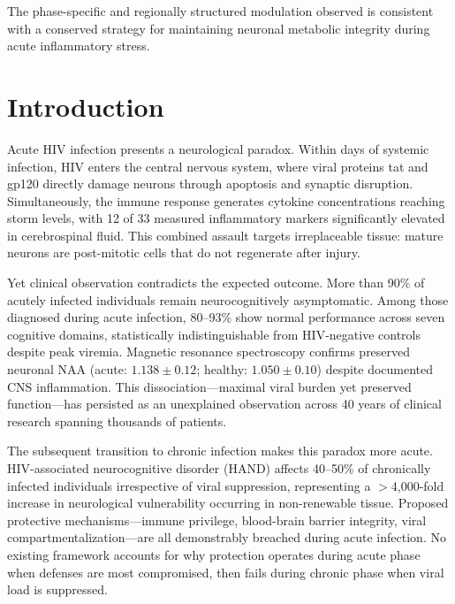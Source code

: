 \documentclass[10pt,a4paper]{article}
\begin{document}
The phase-specific and regionally structured modulation observed is consistent with a conserved strategy for maintaining neuronal metabolic integrity during acute inflammatory stress.

\section{Introduction}

Acute HIV infection presents a neurological paradox. Within days of systemic infection, HIV enters the central nervous system, where viral proteins tat and gp120 directly damage neurons through apoptosis and synaptic disruption\cite{valcour2012,nath2002,kaul1999}. Simultaneously, the immune response generates cytokine concentrations reaching storm levels, with 12 of 33 measured inflammatory markers significantly elevated in cerebrospinal fluid\cite{stacey2009,muema2020}. This combined assault targets irreplaceable tissue: mature neurons are post-mitotic cells that do not regenerate after injury\cite{aranda2012,herrup2007}.

Yet clinical observation contradicts the expected outcome. More than 90\% of acutely infected individuals remain neurocognitively asymptomatic\cite{cheret2025}. Among those diagnosed during acute infection, 80--93\% show normal performance across seven cognitive domains, statistically indistinguishable from HIV-negative controls despite peak viremia\cite{moore2011,cohen2010,schacker1996}. Magnetic resonance spectroscopy confirms preserved neuronal NAA (acute: $1.138 \pm 0.12$; healthy: $1.050 \pm 0.10$) despite documented CNS inflammation\cite{sailasuta2012}. This dissociation---maximal viral burden yet preserved function---has persisted as an unexplained observation across 40 years of clinical research spanning thousands of patients.

The subsequent transition to chronic infection makes this paradox more acute. HIV-associated neurocognitive disorder (HAND) affects 40--50\% of chronically infected individuals irrespective of viral suppression\cite{thompson2024}, representing a $>$4,000-fold increase in neurological vulnerability occurring in non-renewable tissue. Proposed protective mechanisms---immune privilege\cite{carson2006}, blood-brain barrier integrity\cite{banks2006}, viral compartmentalization\cite{joseph2019}---are all demonstrably breached during acute infection\cite{valcour2012,rahimy2015}. No existing framework accounts for why protection operates during acute phase when defenses are most compromised, then fails during chronic phase when viral load is suppressed.
\end{document}
